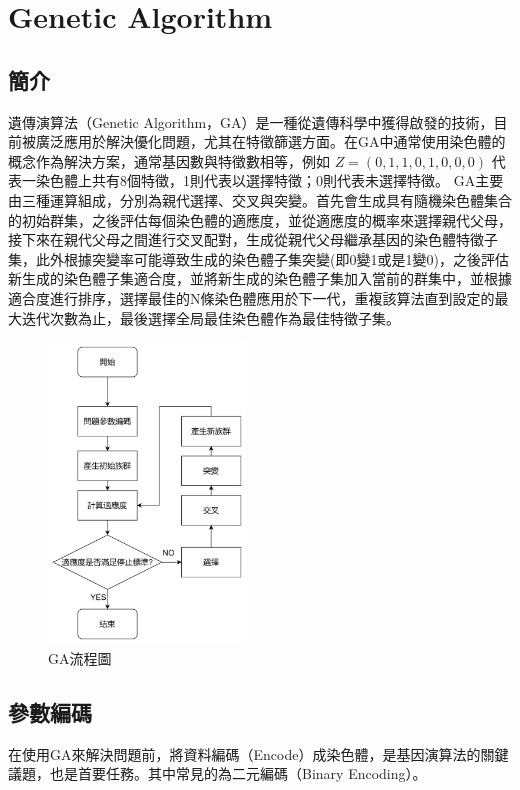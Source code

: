 \chapter{Genetic Algorithm}
\label{chapter:intro}
\section{簡介}
遺傳演算法（Genetic Algorithm，GA）是一種從遺傳科學中獲得啟發的技術，目前被廣泛應用於解決優化問題，尤其在特徵篩選方面。在GA中通常使用染色體的概念作為解決方案，通常基因數與特徵數相等，例如 \(Z=(0,1,1,0,1,0,0,0)\) 代表一染色體上共有8個特徵，1則代表以選擇特徵；0則代表未選擇特徵。
GA主要由三種運算組成，分別為親代選擇、交叉與突變。首先會生成具有隨機染色體集合的初始群集，之後評估每個染色體的適應度，並從適應度的概率來選擇親代父母，接下來在親代父母之間進行交叉配對，生成從親代父母繼承基因的染色體特徵子集，此外根據突變率可能導致生成的染色體子集突變(即0變1或是1變0)，之後評估新生成的染色體子集適合度，並將新生成的染色體子集加入當前的群集中，並根據適合度進行排序，選擇最佳的N條染色體應用於下一代，重複該算法直到設定的最大迭代次數為止，最後選擇全局最佳染色體作為最佳特徵子集。
\begin{figure}[H]
	\centerline{\includegraphics[height=8cm]{pic/GAFlowChart.PNG}}
	\caption{GA流程圖}
	\label{fig:GAFlowChart}
\end{figure}

\label{sec:background}
\section{參數編碼}
在使用GA來解決問題前，將資料編碼（Encode）成染色體，是基因演算法的關鍵議題，也是首要任務。其中常見的為二元編碼（Binary Encoding）。



